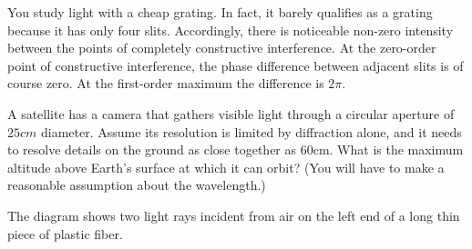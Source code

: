 \documentclass{exam}
\begin{document}
\begin{questions}

\question [30] You study light with a cheap grating. In fact, it barely qualifies as a grating because it has only four slits. Accordingly, there is noticeable non-zero intensity between the points of completely constructive interference. At the zero-order point of constructive interference, the phase difference between adjacent slits is of course zero. At the first-order maximum the difference is $2\pi$.

\clearpage


\question [15] A satellite has a camera that gathers visible light through a circular aperture of $25cm$ diameter. Assume its resolution is limited by diffraction alone, and it needs to resolve details on the ground as close together as 60cm. What is the maximum altitude above Earth's surface at which it can orbit? (You will have to make a reasonable assumption about the wavelength.)
\clearpage

\question [20] The diagram shows two light rays incident from air on the left end of a long thin piece of plastic fiber.


\end{questions}
\end{document}
